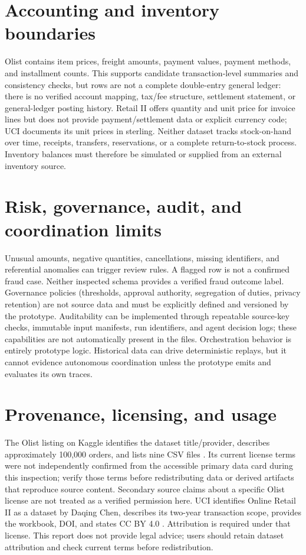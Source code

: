\documentclass[11pt,a4paper]{article}
\begin{document}
\section{Accounting and inventory boundaries}
Olist contains item prices, freight amounts, payment values, payment methods, and installment counts. This supports candidate transaction-level summaries and consistency checks, but rows are not a complete double-entry general ledger: there is no verified account mapping, tax/fee structure, settlement statement, or general-ledger posting history. Retail II offers quantity and unit price for invoice lines but does not provide payment/settlement data or explicit currency code; UCI documents its unit prices in sterling. Neither dataset tracks stock-on-hand over time, receipts, transfers, reservations, or a complete return-to-stock process. Inventory balances must therefore be simulated or supplied from an external inventory source.

\section{Risk, governance, audit, and coordination limits}
Unusual amounts, negative quantities, cancellations, missing identifiers, and referential anomalies can trigger review rules. A flagged row is not a confirmed fraud case. Neither inspected schema provides a verified fraud outcome label. Governance policies (thresholds, approval authority, segregation of duties, privacy retention) are not source data and must be explicitly defined and versioned by the prototype. Auditability can be implemented through repeatable source-key checks, immutable input manifests, run identifiers, and agent decision logs; these capabilities are not automatically present in the files. Orchestration behavior is entirely prototype logic. Historical data can drive deterministic replays, but it cannot evidence autonomous coordination unless the prototype emits and evaluates its own traces.

\section{Provenance, licensing, and usage}
The Olist listing on Kaggle identifies the dataset title/provider, describes approximately 100,000 orders, and lists nine CSV files \cite{olistDataset}. Its current license terms were not independently confirmed from the accessible primary data card during this inspection; verify those terms before redistributing data or derived artifacts that reproduce source content. Secondary source claims about a specific Olist license are not treated as a verified permission here. UCI identifies Online Retail II as a dataset by Daqing Chen, describes its two-year transaction scope, provides the workbook, DOI, and states CC BY 4.0 \cite{chen2012}. Attribution is required under that license. This report does not provide legal advice; users should retain dataset attribution and check current terms before redistribution.
\end{document}

